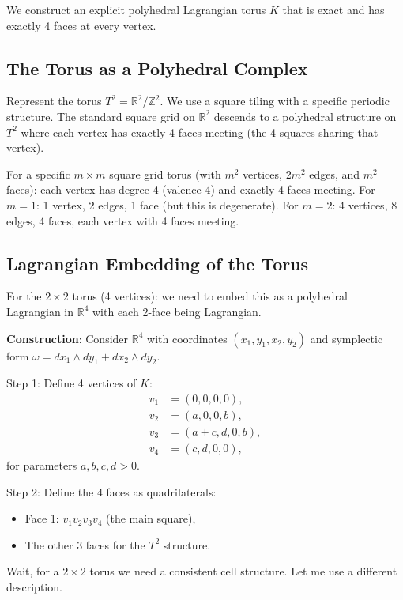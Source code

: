 \documentclass[12pt]{article}
\theoremstyle{definition}
\begin{document}
We construct an explicit polyhedral Lagrangian torus $K$ that is exact and has exactly 4 faces at every vertex.

\subsection{The Torus as a Polyhedral Complex}

Represent the torus $T^2 = \mathbb{R}^2/\mathbb{Z}^2$. We use a square tiling with a specific periodic structure. The standard square grid on $\mathbb{R}^2$ descends to a polyhedral structure on $T^2$ where each vertex has exactly 4 faces meeting (the 4 squares sharing that vertex).

For a specific $m\times m$ square grid torus (with $m^2$ vertices, $2m^2$ edges, and $m^2$ faces): each vertex has degree 4 (valence 4) and exactly 4 faces meeting. For $m = 1$: 1 vertex, 2 edges, 1 face (but this is degenerate). For $m = 2$: 4 vertices, 8 edges, 4 faces, each vertex with 4 faces meeting.

\subsection{Lagrangian Embedding of the Torus}

For the $2\times 2$ torus (4 vertices): we need to embed this as a polyhedral Lagrangian in $\mathbb{R}^4$ with each 2-face being Lagrangian.

\textbf{Construction}: Consider $\mathbb{R}^4$ with coordinates $(x_1,y_1,x_2,y_2)$ and symplectic form $\omega = dx_1\wedge dy_1 + dx_2\wedge dy_2$.

Step 1: Define 4 vertices of $K$:
\begin{align*}
v_1 &= (0,0,0,0),\\
v_2 &= (a,0,0,b),\\
v_3 &= (a+c,d,0,b),\\
v_4 &= (c,d,0,0),
\end{align*}
for parameters $a,b,c,d > 0$.

Step 2: Define the 4 faces as quadrilaterals:
\begin{itemize}
\item Face 1: $v_1v_2v_3v_4$ (the main square),
\item The other 3 faces for the $T^2$ structure.
\end{itemize}

Wait, for a $2\times 2$ torus we need a consistent cell structure. Let me use a different description.
\end{document}
